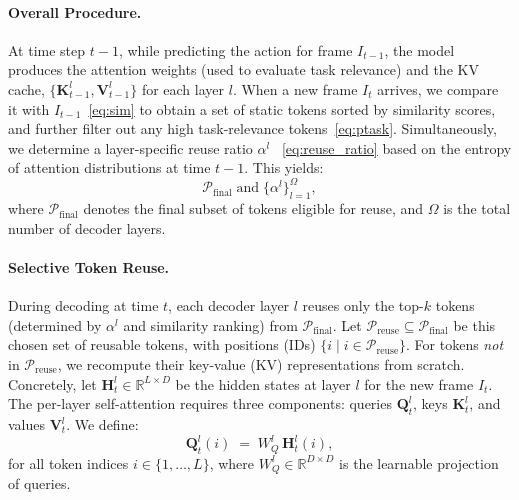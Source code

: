 \paragraph{Overall Procedure.}
At time step \(t-1\), while predicting the action for frame \(I_{t-1}\), the model produces the attention weights (used to evaluate task relevance) and the KV cache, \(\{\mathbf{K}_{t-1}^l,\mathbf{V}_{t-1}^l\}\) for each layer \(l\). When a new frame \(I_t\) arrives, we compare it with \(I_{t-1}\)~\eqref{eq:sim} to obtain a set of static tokens sorted by similarity scores, and further filter out any high task-relevance tokens~\eqref{eq:ptask}. Simultaneously, we determine a layer-specific reuse ratio \(\alpha^l\) ~\eqref{eq:reuse_ratio} based on the entropy of attention distributions at time \(t-1\). This yields:
\begin{equation}
\label{eq:final_token_set}
\mathcal{P}_{\mathrm{final}} \;\text{and}\; \{\alpha^l\}_{l=1}^{\Omega},
\end{equation}
where \(\mathcal{P}_{\mathrm{final}}\) denotes the final subset of tokens eligible for reuse, and \(\Omega\) is the total number of decoder layers. 

\paragraph{Selective Token Reuse.}
During decoding at time \(t\), each decoder layer \(l\) reuses only the top-\(k\) tokens (determined by \(\alpha^l\) and similarity ranking) from \(\mathcal{P}_{\mathrm{final}}\). Let \(\mathcal{P}_{\mathrm{reuse}}\subseteq \mathcal{P}_{\mathrm{final}}\) be this chosen set of reusable tokens, with positions (IDs) \(\{i\mid i\in \mathcal{P}_{\mathrm{reuse}}\}\). For tokens \emph{not} in \(\mathcal{P}_{\mathrm{reuse}}\), we recompute their key-value (KV) representations from scratch. Concretely, let \(\mathbf{H}_t^l\in\mathbb{R}^{L\times D}\) be the hidden states at layer \(l\) for the new frame \(I_t\). The per-layer self-attention requires three components: queries \(\mathbf{Q}_t^l\), keys \(\mathbf{K}_t^l\), and values \(\mathbf{V}_t^l\). We define:
\begin{equation}
\label{eq:q_formula}
\mathbf{Q}_t^l(i) \;=\; W_Q^l\,\mathbf{H}_t^l(i), 
\end{equation}
for all token indices \(i \in \{1,\ldots,L\}\), where \(W_Q^l\in\mathbb{R}^{D\times D}\) is the learnable projection of queries.

